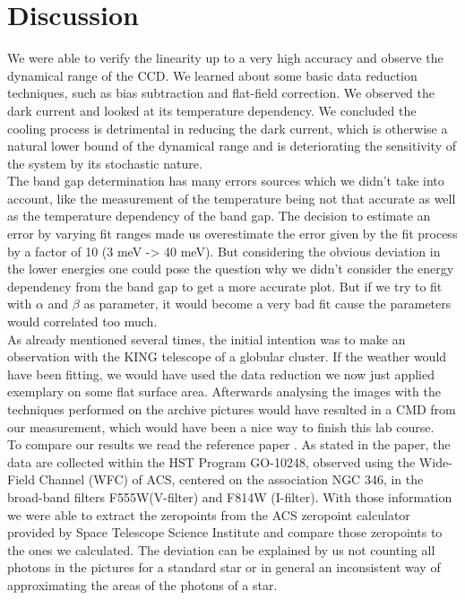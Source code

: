 \section{Discussion}
We were able to verify the linearity up to a very high accuracy and observe the dynamical range of the CCD. We learned about some basic data reduction techniques, such as bias subtraction and flat-field correction. We observed the dark current and looked at its temperature dependency. We concluded the cooling process is detrimental in reducing the dark current, which is otherwise a natural lower bound of  the dynamical range and is deteriorating the sensitivity of the system by its stochastic nature.
\vspace{2mm}\\
The band gap determination has many errors sources which we didn't take into account, like the measurement of the temperature being not that accurate as well as the temperature dependency of the band gap. The decision to estimate an error by varying fit ranges made us overestimate the error given by the fit process by a factor of 10 (3 meV -> 40 meV). But considering the obvious deviation in the lower energies one could pose the question why we didn't consider the energy dependency from the band gap to get a more accurate plot. But if we try to fit with $\alpha$ and $\beta$ as parameter, it would become a very bad fit cause the parameters would correlated too much.
\vspace{2mm}\\
As already mentioned several times, the initial intention was to make an observation with the KING telescope of a globular cluster. If the weather would have been fitting, we would have used the data reduction we now just applied exemplary on some flat surface area. Afterwards analysing the images with the techniques performed on the archive pictures would have resulted in a CMD from our measurement, which would have been a nice way to finish this lab course.
\vspace{2mm}\\
To compare our results we read the reference paper \cite{rochau2007star}. As stated in the paper, the data are collected within the HST Program GO-10248, observed using the Wide-Field Channel (WFC) of ACS, centered on the association NGC 346, in the broad-band filters F555W(V-filter) and F814W (I-filter). With those information we were able to extract the zeropoints from the ACS zeropoint calculator \cite{HST_zeropoints} provided by Space Telescope Science Institute and compare those zeropoints to the ones we calculated. The deviation can be explained by us not counting all photons in the pictures for a standard star or in general an inconsistent way of approximating the areas of the photons of a star.\\